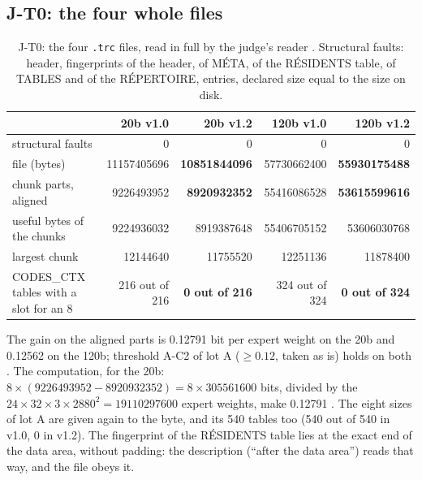 \subsection{J-T0: the four whole files}\label{t3jug:sec:jt0}

\begin{table}[ht]
\centering\footnotesize
\caption[J-T0: the four files, through the judge's reader]{J-T0: the four \texttt{.trc} files, read in full by the judge's reader \mes. Structural faults: header, fingerprints of the header, of MÉTA, of the RÉSIDENTS table, of TABLES and of the RÉPERTOIRE, entries, declared size equal to the size on disk.}
\label{t3jug:tab:jt0}
\begin{tabular}{@{}lrrrr@{}}
\toprule
& 20b v1.0 & 20b v1.2 & 120b v1.0 & 120b v1.2 \\
\midrule
structural faults & 0 & 0 & 0 & 0 \\
file (bytes) & \num{11157405696} & \textbf{\num{10851844096}} & \num{57730662400} & \textbf{\num{55930175488}} \\
chunk parts, aligned & \num{9226493952} & \textbf{\num{8920932352}} & \num{55416086528} & \textbf{\num{53615599616}} \\
useful bytes of the chunks & \num{9224936032} & \num{8919387648} & \num{55406705152} & \num{53606030768} \\
largest chunk & \num{12144640} & \num{11755520} & \num{12251136} & \num{11878400} \\
CODES\_CTX tables with a slot for an 8 & 216 out of 216 & \textbf{0 out of 216} & 324 out of 324 & \textbf{0 out of 324} \\
\bottomrule
\end{tabular}
\end{table}

The gain on the aligned parts is \num{0.12791} bit per expert weight on the 20b and \num{0.12562} on the 120b; threshold A-C2 of lot A ($\ge \num{0.12}$, taken as is) holds on both \mes. The computation, for the 20b: $8 \times (\num{9226493952} - \num{8920932352}) = 8 \times \num{305561600}$ bits, divided by the $24 \times 32 \times 3 \times \num{2880}^2 = \num{19110297600}$ expert weights, make \num{0.12791} \calc. The eight sizes of lot A are given again to the byte, and its 540 tables too (540 out of 540 in v1.0, 0 in v1.2). The fingerprint of the RÉSIDENTS table lies at the exact end of the data area, without padding: the description (``after the data area'') reads that way, and the file obeys it.

